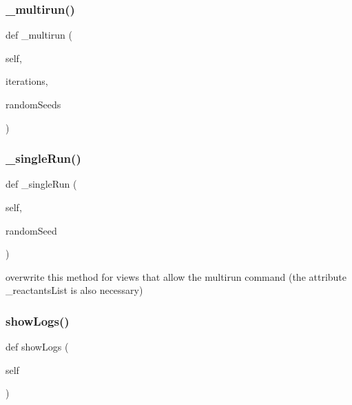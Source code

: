 \subsubsection{\texorpdfstring{\+\_\+multirun()}{\_multirun()}}
{\footnotesize\ttfamily def \+\_\+multirun (\begin{DoxyParamCaption}\item[{}]{self,  }\item[{}]{iterations,  }\item[{}]{random\+Seeds }\end{DoxyParamCaption})\hspace{0.3cm}{\ttfamily [private]}}

\mbox{\label{class_mu_mo_t_1_1_mu_mo_tview_a51d421aacb4cd83af5f1c2e60c3dff9c}} 
\subsubsection{\texorpdfstring{\+\_\+single\+Run()}{\_singleRun()}}
{\footnotesize\ttfamily def \+\_\+single\+Run (\begin{DoxyParamCaption}\item[{}]{self,  }\item[{}]{random\+Seed }\end{DoxyParamCaption})\hspace{0.3cm}{\ttfamily [private]}}



overwrite this method for views that allow the \textquotesingle{}multirun\textquotesingle{} command (the attribute \+\_\+reactants\+List is also necessary) 

\mbox{\label{class_mu_mo_t_1_1_mu_mo_tview_aca4d648d909f4722c7e07197675500bb}} 
\subsubsection{\texorpdfstring{show\+Logs()}{showLogs()}}
{\footnotesize\ttfamily def show\+Logs (\begin{DoxyParamCaption}\item[{}]{self }\end{DoxyParamCaption})}



